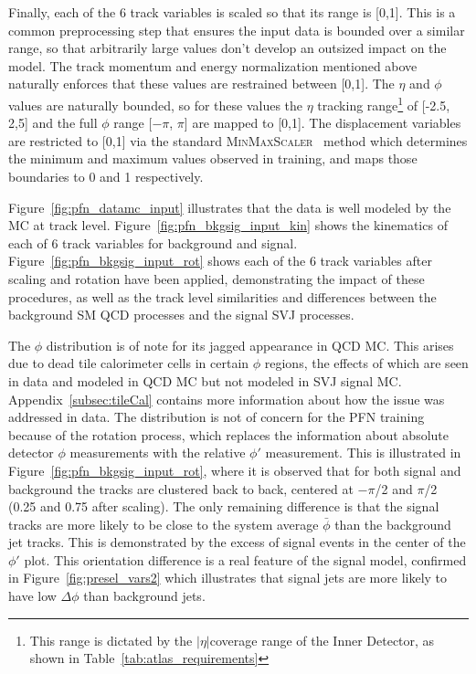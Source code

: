 Finally, each of the 6 track variables is scaled so that its range is [0,1]. This is a common preprocessing step that ensures the input data is bounded over a similar range, so that arbitrarily large values don't develop an outsized impact on the model. The track momentum and energy normalization mentioned above naturally enforces that these values are restrained between [0,1]. The $\eta$ and $\phi$ values are naturally bounded, so for these values the $\eta$ tracking range\footnote{This range is dictated by the $|\eta|$coverage range of the Inner Detector, as shown in Table~\ref{tab:atlas_requirements}} of [-2.5, 2,5] and the full $\phi$ range [$-\pi$, $\pi$] are mapped to [0,1]. The displacement variables are restricted to [0,1] via the standard \textsc{MinMaxScaler}~\cite{scikit-learn} method which determines the minimum and maximum values observed in training, and maps those boundaries to 0 and 1 respectively. \par

Figure~\ref{fig:pfn_datamc_input} illustrates that the data is well modeled by the MC at track level. Figure~\ref{fig:pfn_bkgsig_input_kin} shows the kinematics of each of 6 track variables for background and signal. Figure~\ref{fig:pfn_bkgsig_input_rot} shows each of the 6 track variables after scaling and rotation have been applied, demonstrating the impact of these procedures, as well as the track level similarities and differences between the background SM QCD processes and the signal SVJ processes. \par

The $\phi$ distribution is of note for its jagged appearance in QCD MC. This arises due to dead tile calorimeter cells in certain $\phi$ regions, the effects of which are seen in data and modeled in QCD MC but not modeled in SVJ signal MC. Appendix~\ref{subsec:tileCal} contains more information about how the issue was addressed in data. The distribution is not of concern for the PFN training because of the rotation process, which replaces the information about absolute detector $\phi$ measurements with the relative $\phi'$ measurement. This is illustrated in Figure~\ref{fig:pfn_bkgsig_input_rot}, where it is observed that for both signal and background the tracks are clustered back to back, centered at $-\pi$/2 and $\pi$/2 (0.25 and 0.75 after scaling). The only remaining difference is that the signal tracks are more likely to be close to the system average $\bar{\phi}$ than the background jet tracks. This is demonstrated by the excess of signal events in the center of the $\phi'$ plot. This orientation difference is a real feature of the signal model, confirmed in Figure~\ref{fig:presel_vars2} which illustrates that signal jets are more likely to have low $\Delta\phi$ than background jets. 

